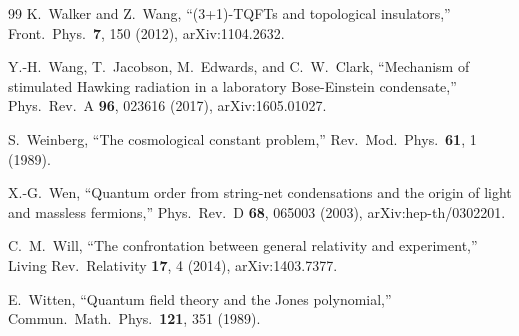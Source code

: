 \documentclass[aps,prd,reprint,nofootinbib,superscriptaddress]{revtex4-2}
\begin{document}
\begin{thebibliography}{99}
K.~Walker and Z.~Wang,
``(3+1)-TQFTs and topological insulators,''
Front.\ Phys.\ \textbf{7}, 150 (2012),
arXiv:1104.2632.

Y.-H.~Wang, T.~Jacobson, M.~Edwards, and C.~W.~Clark,
``Mechanism of stimulated Hawking radiation in a laboratory
Bose-Einstein condensate,''
Phys.\ Rev.\ A \textbf{96}, 023616 (2017),
arXiv:1605.01027.

S.~Weinberg,
``The cosmological constant problem,''
Rev.\ Mod.\ Phys.\ \textbf{61}, 1 (1989).

X.-G.~Wen,
``Quantum order from string-net condensations and the origin of light
and massless fermions,''
Phys.\ Rev.\ D \textbf{68}, 065003 (2003),
arXiv:hep-th/0302201.

C.~M.~Will,
``The confrontation between general relativity and experiment,''
Living Rev.\ Relativity \textbf{17}, 4 (2014),
arXiv:1403.7377.

E.~Witten,
``Quantum field theory and the Jones polynomial,''
Commun.\ Math.\ Phys.\ \textbf{121}, 351 (1989).

\end{thebibliography}
\end{document}
